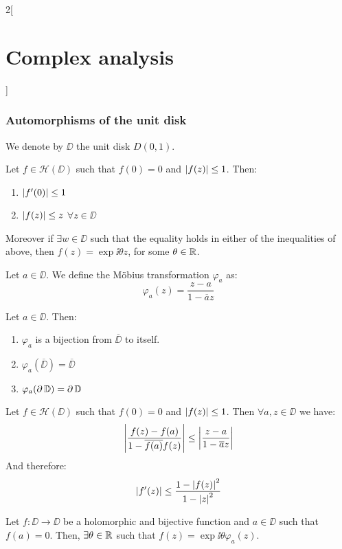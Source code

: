 \documentclass[../../../main_math.tex]{subfiles}
\begin{document}
\begin{multicols}{2}[\section{Complex analysis}]
  \subsubsection{Automorphisms of the unit disk}
  \begin{definition}
    We denote by $\DD$ the unit disk $D(0,1)$.
  \end{definition}
  \begin{lemma}
    Let $f\in\mathcal{H}(\DD)$ such that $f(0)=0$ and $\abs{f(z)}\leq 1$. Then:
    \begin{enumerate}
      \item $\abs{f'(0)}\leq 1$
      \item $\abs{f(z)}\leq z$ $\forall z\in \DD$
    \end{enumerate}
    Moreover if $\exists w\in \DD$ such that the equality holds in either of the inequalities of above, then $f(z)=\exp{\ii \theta} z$, for some $\theta\in\mathbb{R}$.
  \end{lemma}
  \begin{definition}
    Let $a\in \DD$. We define the Möbius transformation $\varphi_a$ as: $$\varphi_a(z)=\frac{z-a}{1-\overline{a}z}$$
  \end{definition}
  \begin{proposition}
    Let $a\in \DD$. Then:
    \begin{enumerate}
      \item $\varphi_a$ is a bijection from $\overline{\DD}$ to itself.
      \item $\varphi_a(\overline{\DD})=\overline{\DD}$
      \item $\varphi_a(\operatorname{\partial}{\mathbb{D}})=\operatorname{\partial}{\mathbb{D}}$
    \end{enumerate}
  \end{proposition}
  \begin{lemma}
    Let $f\in\mathcal{H}(\DD)$ such that $f(0)=0$ and $\abs{f(z)}\leq 1$. Then $\forall a,z\in \DD$ we have:
    $$\abs{\frac{f(z)-f(a)}{1-\overline{f(a)}f(z)}}\leq\abs{\frac{z-a}{1-\overline{a}z}}$$
    And therefore: $$\abs{f'(z)}\leq\frac{1-{\abs{f(z)}}^2}{1-{\abs{z}}^2}$$
  \end{lemma}
  \begin{theorem}
    Let $f:\DD\rightarrow \DD$ be a holomorphic and bijective function and $a\in \DD$ such that $f(a)=0$. Then, $\exists\theta\in\mathbb{R}$ such that $f(z)=\exp{\ii \theta} \varphi_a(z)$.
  \end{theorem}

\end{multicols}
\end{document}
